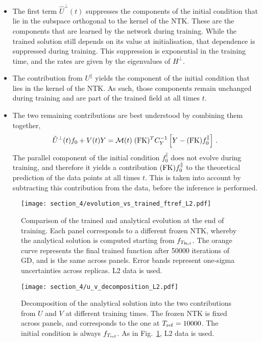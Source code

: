 \begin{itemize}
    \item The first term $\hat{U}^\perp(t)$ suppresses the components of the
    initial condition that lie in the subspace orthogonal to the kernel of the
    NTK. These are the components that are learned by the network during
    training. While the trained solution still depends on its value at
    initialisation, that dependence is suppressed during training. This
    suppression is exponential in the training time, and the rates are given by
    the eigenvalues of $H^{\perp}$.
    \item The contribution from $U^\parallel$ yields the component of the
    initial condition that lies in the kernel of the NTK. As such, those
    components remain unchanged during training and are part of the trained
    field at all times $t$. 
    \item The two remaining contributions are best understood by combining them
    together,
    \begin{align}
        \label{eq:DataCorrectedInference}
        \check{U}^{\perp}(t) f_{0} + V(t) Y 
            = \mathcal{M}(t)\; (\mathrm{FK})^T C_Y^{-1} \left[Y - (\mathrm{FK}) f_{0}^{\parallel}\right]\, .
    \end{align}
    The parallel component of the initial condition $f_{0}^{\parallel}$ does not
    evolve during training, and therefore it yields a contribution $(\mathrm{FK})
    f_{0}^{\parallel}$ to the theoretical prediction of the data points at all
    times $t$. This is taken into account by subtracting this contribution from
    the data, before the inference is performed.
\end{itemize}

\begin{figure}[t]
  \centering
  \texttt{[image: section\_4/evolution\_vs\_trained\_ftref\_L2.pdf]} 
  \caption{Comparison of the trained and analytical evolution at the end of
  training. Each panel corresponds to a different frozen NTK, whereby the
  analytical solution is computed starting from $f_{T_{\rm Ref}}$. The orange
  curve represents the final trained function after 50000 iterations of GD, and
  is the same across panels. Error bands represent one-sigma uncertainties
  across replicas. L2 data is used.}
  \label{fig:OnsetLazyL2}
\end{figure}
\begin{figure}[t]
  \centering
  \texttt{[image: section\_4/u\_v\_decomposition\_L2.pdf]} 
  \caption{Decomposition of the analytical solution into the two contributions
  from $U$ and $V$ at different training times. The frozen NTK is fixed across
  panels, and corresponds to the one at $T_{\rm ref} = 10000$. The initial
  condition is always $f_{T_{\rm ref}}$. As in Fig.~\ref{fig:OnsetLazyL2}, L2 data
  is used.}
  \label{fig:FrefDecompositionL2}
\end{figure}

